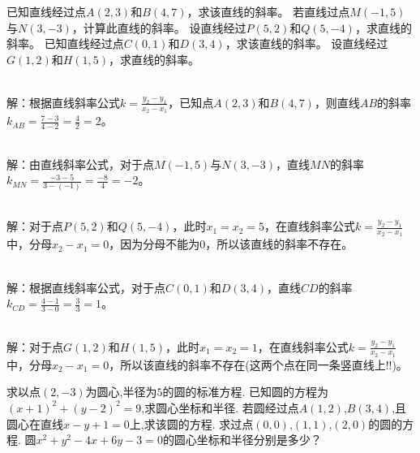 \documentclass{ctexart}
\newenvironment{MyAnswer}[1][] %
{
    \begin{tcolorbox}[breakable, colframe=blue]
    \begin{Answer}[#1] \color{blue} \kaishu
        }  %
    {\end{Answer}
\end{tcolorbox}
}
\begin{document}
\begin{Exercise}[title={直线斜率计算小练习}, label={ex:line_slope}]
    \Question 已知直线经过点\(A(2, 3)\)和\(B(4, 7)\)，求该直线的斜率。
    \Question 若直线过点\(M(-1, 5)\)与\(N(3, -3)\)，计算此直线的斜率。
    \Question 设直线经过\(P(5, 2)\)和\(Q(5, -4)\)，求直线的斜率。
    \Question 已知直线经过点\(C(0, 1)\)和\(D(3, 4)\)，求该直线的斜率。
    \Question 设直线经过\(G(1, 2)\)和\(H(1, 5)\)，求直线的斜率。
\end{Exercise}
\begin{MyAnswer}[ref={ex:line_slope}]
    \Question {}\\ 解：根据直线斜率公式\(k = \frac{y_2 - y_1}{x_2 - x_1}\)，已知点\(A(2, 3)\)和\(B(4, 7)\)，则直线\(AB\)的斜率\(k_{AB}=\frac{7 - 3}{4 - 2}=\frac{4}{2}=2\)。

    \Question {}\\ 解：由直线斜率公式，对于点\(M(-1, 5)\)与\(N(3, -3)\)，直线\(MN\)的斜率\(k_{MN}=\frac{-3 - 5}{3 - (-1)}=\frac{-8}{4}=-2\)。

    \Question  {}\\  解：对于点\(P(5, 2)\)和\(Q(5, -4)\)，此时\(x_1 = x_2 = 5\)，在直线斜率公式\(k = \frac{y_2 - y_1}{x_2 - x_1}\)中，分母\(x_2 - x_1 = 0\)，因为分母不能为\(0\)，所以该直线的斜率不存在。

    \Question {}\\ 解：根据直线斜率公式，对于点\(C(0, 1)\)和\(D(3, 4)\)，直线\(CD\)的斜率\(k_{CD}=\frac{4 - 1}{3 - 0}=\frac{3}{3}=1\)。


    \Question {}\\ 解：对于点\(G(1, 2)\)和\(H(1, 5)\)，此时\(x_1 = x_2 = 1\)，在直线斜率公式\(k = \frac{y_2 - y_1}{x_2 - x_1}\)中，分母\(x_2 - x_1 = 0\)，所以该直线的斜率不存在(这两个点在同一条竖直线上!!)。

\end{MyAnswer}




















\begin{Exercise}[title={圆的基本性质练习}, label={ex:circle-properties},difficulty=3]
    \Question 求以点$(2, -3)$为圆心,半径为$5$的圆的标准方程.
    \Question 已知圆的方程为$(x + 1)^2+(y - 2)^2 = 9$,求圆心坐标和半径.
    \Question 若圆经过点$A(1,2)$,$B(3,4)$,且圆心在直线$x - y + 1 = 0$上,求该圆的方程.
    \Question 求过点$(0,0)$,$(1,1)$,$(2,0)$的圆的方程.
    \Question 圆$x^2 + y^2 - 4x + 6y - 3 = 0$的圆心坐标和半径分别是多少？
\end{Exercise}
\end{document}
